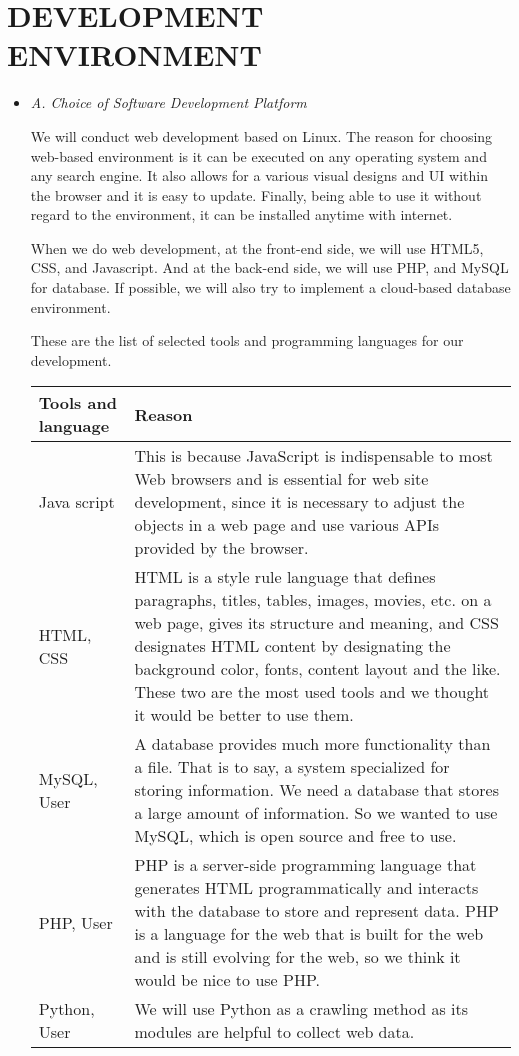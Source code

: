 \documentclass[landscape,twocolumn, letterpaper]{scrartcl}
\begin{document}
\section{DEVELOPMENT ENVIRONMENT}
\begin{itemize}
\item 
\textit{A. Choice of Software Development Platform}

We will conduct web development based on Linux. The reason for choosing web-based environment is it can be executed on any operating system and any search engine. It also allows for a various visual designs and UI within the browser and it is easy to update. Finally, being able to use it without regard to the environment, it can be installed anytime with internet.

When we do web development, at the front-end side, we will use HTML5, CSS, and Javascript. And at the back-end side, we will use PHP, and MySQL for database. If possible, we will also try to implement a cloud-based database environment.

These are the list of selected tools and programming languages for our development.

\begin{adjustbox}{width=8cm}
   \begin{center}
    \begin{tabular}{|p{3cm}|p{5cm}|}
    \hline
      Tools and language & Reason\\
    \hline
     Java script & This is because JavaScript is indispensable to most Web browsers and is essential for web site development, since it is necessary to adjust the objects in a web page and use various APIs provided by the browser. \\
    \hline
      HTML, CSS & HTML is a style rule language that defines paragraphs, titles, tables, images, movies, etc. on a web page, gives its structure and meaning, and CSS designates HTML content by designating the background color, fonts, content layout and the like. These two are the most used tools and we thought it would be better to use them.\\
    \hline
      MySQL, User & A database provides much more functionality than a file. That is to say, a system specialized for storing information. We need a database that stores a large amount of information. So we wanted to use MySQL, which is open source and free to use.\\
    \hline
      PHP, User & PHP is a server-side programming language that generates HTML programmatically and interacts with the database to store and represent data. PHP is a language for the web that is built for the web and is still evolving for the web, so we think it would be nice to use PHP.\\
    \hline
      Python, User & We will use Python as a crawling method as its modules are helpful to collect web data.\\
    \hline
    \end{tabular}
    \end{center}
\end{adjustbox}


\end{itemize}
\end{document}
